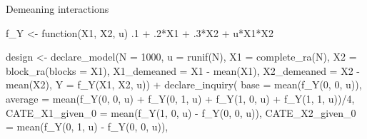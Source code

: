 \documentclass[
  11pt,
  ignorenonframetext,
]{beamer}
\newenvironment{Shaded}{\begin{snugshade}}{\end{snugshade}}
\newcommand{\AttributeTok}[1]{\textcolor[rgb]{0.40,0.45,0.13}{#1}}
\newcommand{\ControlFlowTok}[1]{\textcolor[rgb]{0.00,0.23,0.31}{#1}}
\newcommand{\DecValTok}[1]{\textcolor[rgb]{0.68,0.00,0.00}{#1}}
\newcommand{\FunctionTok}[1]{\textcolor[rgb]{0.28,0.35,0.67}{#1}}
\newcommand{\NormalTok}[1]{\textcolor[rgb]{0.00,0.23,0.31}{#1}}
\newcommand{\OtherTok}[1]{\textcolor[rgb]{0.00,0.23,0.31}{#1}}
\newcommand{\SpecialCharTok}[1]{\textcolor[rgb]{0.37,0.37,0.37}{#1}}
\begin{document}
\begin{frame}[fragile]{Demeaning interactions}
\protect\hypertarget{demeaning-interactions}{}
\begin{Shaded}
\begin{Highlighting}[]
\NormalTok{f\_Y }\OtherTok{\textless{}{-}} \ControlFlowTok{function}\NormalTok{(X1, X2, u) .}\DecValTok{1} \SpecialCharTok{+}\NormalTok{ .}\DecValTok{2}\SpecialCharTok{*}\NormalTok{X1 }\SpecialCharTok{+}\NormalTok{ .}\DecValTok{3}\SpecialCharTok{*}\NormalTok{X2 }\SpecialCharTok{+}\NormalTok{ u}\SpecialCharTok{*}\NormalTok{X1}\SpecialCharTok{*}\NormalTok{X2}

\NormalTok{design }\OtherTok{\textless{}{-}}
  \FunctionTok{declare\_model}\NormalTok{(}\AttributeTok{N =} \DecValTok{1000}\NormalTok{,}
                \AttributeTok{u =} \FunctionTok{runif}\NormalTok{(N),}
                \AttributeTok{X1 =} \FunctionTok{complete\_ra}\NormalTok{(N),}
                \AttributeTok{X2 =} \FunctionTok{block\_ra}\NormalTok{(}\AttributeTok{blocks =}\NormalTok{ X1),}
                \AttributeTok{X1\_demeaned =}\NormalTok{ X1 }\SpecialCharTok{{-}} \FunctionTok{mean}\NormalTok{(X1),}
                \AttributeTok{X2\_demeaned =}\NormalTok{ X2 }\SpecialCharTok{{-}} \FunctionTok{mean}\NormalTok{(X2),}
                \AttributeTok{Y =} \FunctionTok{f\_Y}\NormalTok{(X1, X2, u)) }\SpecialCharTok{+}
  \FunctionTok{declare\_inquiry}\NormalTok{(}
    \AttributeTok{base =} \FunctionTok{mean}\NormalTok{(}\FunctionTok{f\_Y}\NormalTok{(}\DecValTok{0}\NormalTok{, }\DecValTok{0}\NormalTok{, u)),}
    \AttributeTok{average =} \FunctionTok{mean}\NormalTok{(}\FunctionTok{f\_Y}\NormalTok{(}\DecValTok{0}\NormalTok{, }\DecValTok{0}\NormalTok{, u) }\SpecialCharTok{+} \FunctionTok{f\_Y}\NormalTok{(}\DecValTok{0}\NormalTok{, }\DecValTok{1}\NormalTok{, u)  }\SpecialCharTok{+} \FunctionTok{f\_Y}\NormalTok{(}\DecValTok{1}\NormalTok{, }\DecValTok{0}\NormalTok{, u)  }\SpecialCharTok{+} \FunctionTok{f\_Y}\NormalTok{(}\DecValTok{1}\NormalTok{, }\DecValTok{1}\NormalTok{, u))}\SpecialCharTok{/}\DecValTok{4}\NormalTok{,}
    \AttributeTok{CATE\_X1\_given\_0 =} \FunctionTok{mean}\NormalTok{(}\FunctionTok{f\_Y}\NormalTok{(}\DecValTok{1}\NormalTok{, }\DecValTok{0}\NormalTok{, u) }\SpecialCharTok{{-}} \FunctionTok{f\_Y}\NormalTok{(}\DecValTok{0}\NormalTok{, }\DecValTok{0}\NormalTok{, u)),}
    \AttributeTok{CATE\_X2\_given\_0 =} \FunctionTok{mean}\NormalTok{(}\FunctionTok{f\_Y}\NormalTok{(}\DecValTok{0}\NormalTok{, }\DecValTok{1}\NormalTok{, u) }\SpecialCharTok{{-}} \FunctionTok{f\_Y}\NormalTok{(}\DecValTok{0}\NormalTok{, }\DecValTok{0}\NormalTok{, u)),}

\end{Highlighting}
\end{Shaded}
\end{frame}
\end{document}
